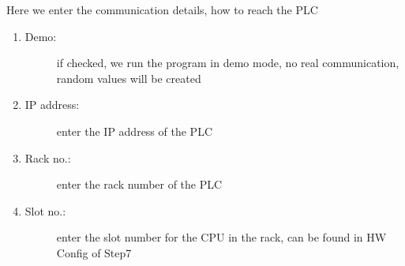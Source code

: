 \documentclass[a4paper,10pt,english]{sphinxmanual}
\begin{document}
Here we enter the communication details, how to reach the PLC
\begin{enumerate}
%
\item {} \begin{description}
\item[{Demo:}] \leavevmode
if checked, we run the program in demo mode, no real communication, random values will be created

\end{description}

\item {} \begin{description}
\item[{IP address:}] \leavevmode
enter the IP address of the PLC

\end{description}

\item {} \begin{description}
\item[{Rack no.:}] \leavevmode
enter the rack number of the PLC

\end{description}

\item {} \begin{description}
\item[{Slot no.:}] \leavevmode
enter the slot number for the CPU in the rack, can be found in HW Config of Step7

\end{description}

\end{enumerate}

\end{document}
